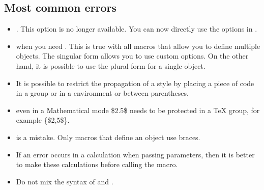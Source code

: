 \subsection{Most common errors}  
 \begin{itemize}\setlength{\itemsep}{10pt} 
    
\item {}. This option is no longer available. You can now directly use the options in \TIKZ.
 
 \item {} when you need . This is true with all macros that allow you to define multiple objects. The singular form allows you to use custom options. On the other hand, it is possible to use the plural form for a single object.
 
 
 \item {} It is possible to restrict the propagation of a style by placing a piece of code in a group or in a  environment or between parentheses.
  
 \item  {} even in a Mathematical mode \$2.5\$ needs to be protected in a TeX group, for example \{\$2,5\$\}. 
 
\item  {} is a mistake. Only macros that define an object use braces.  
  \item If an error occurs in a calculation when passing parameters, then it is better to make these calculations before calling the macro.
  \item Do not mix the syntax of  and .
 \end{itemize} 

\endinput